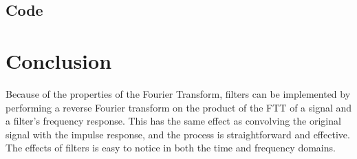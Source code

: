 \documentclass[11pt]{article}
\begin{document}
\subsection{Code}



\section{Conclusion}

Because of the properties of the Fourier Transform, filters can be
implemented by performing a reverse Fourier transform on the product
of the FTT of a signal and a filter's frequency response.
This has the same effect as convolving the original signal with the
impulse response, and the process is straightforward and effective.\\

The effects of filters is easy to notice in both the time and frequency domains.
\end{document}
